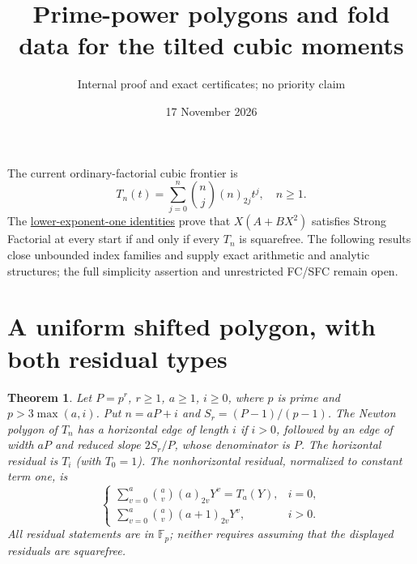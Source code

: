 \documentclass[11pt]{article}
\title{Prime-power polygons and fold data for the tilted cubic moments}
\author{Internal proof and exact certificates; no priority claim}
\date{17 November 2026}
\newtheorem{theorem}{Theorem}
\begin{document}
\maketitle
The current ordinary-factorial cubic frontier is
\[
 T_n(t)=\sum_{j=0}^n\binom nj(n)_{2j}t^j,\quad n\ge1.
\]
The \href{DYADIC_BINOMIAL_SFC.tex}{lower-exponent-one identities} prove
that $X(A+BX^2)$ satisfies Strong Factorial at every start if and only
if every $T_n$ is squarefree. The following results close unbounded index
families and supply exact arithmetic and analytic structures; the full
simplicity assertion and unrestricted FC/SFC remain open.

\section{A uniform shifted polygon, with both residual types}
\begin{theorem}\label{thm:shift}
Let $P=p^r$, $r\ge1$, $a\ge1$, $i\ge0$, where $p$ is prime and
$p>3\max(a,i)$. Put $n=aP+i$ and $S_r=(P-1)/(p-1)$.
The Newton polygon of $T_n$ has a horizontal edge of length $i$ if
$i>0$, followed by an edge of width $aP$ and reduced slope
$2S_r/P$, whose denominator is $P$.
The horizontal residual is $T_i$ (with $T_0=1$).
The nonhorizontal residual, normalized to constant term one, is
\[
 \begin{cases}
 \displaystyle \sum_{v=0}^a\binom av(a)_{2v}Y^v=T_a(Y),&i=0,\\[3pt]
 \displaystyle \sum_{v=0}^a\binom av(a+1)_{2v}Y^v,&i>0.
 \end{cases}                                                   \tag{1}
\]
All residual statements are in $\mathbb F_p$; neither requires assuming
that the displayed residuals are squarefree.
\end{theorem}
\end{document}
